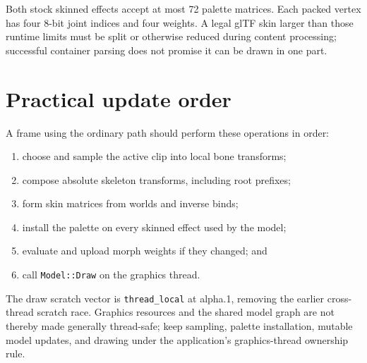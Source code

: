 Both stock skinned effects accept at most 72 palette matrices. Each packed vertex has four
8-bit joint indices and four weights. A legal glTF skin larger than those runtime limits must
be split or otherwise reduced during content processing; successful container parsing does not
promise it can be drawn in one part.

\section{Practical update order}

A frame using the ordinary path should perform these operations in order:

\begin{enumerate}
  \item choose and sample the active clip into local bone transforms;
  \item compose absolute skeleton transforms, including root prefixes;
  \item form skin matrices from worlds and inverse binds;
  \item install the palette on every skinned effect used by the model;
  \item evaluate and upload morph weights if they changed; and
  \item call \texttt{Model::Draw} on the graphics thread.
\end{enumerate}

The draw scratch vector is \texttt{thread\_local} at alpha.1, removing the earlier cross-thread
scratch race. Graphics resources and the shared model graph are not thereby made generally
thread-safe; keep sampling, palette installation, mutable model updates, and drawing under the
application's graphics-thread ownership rule.
